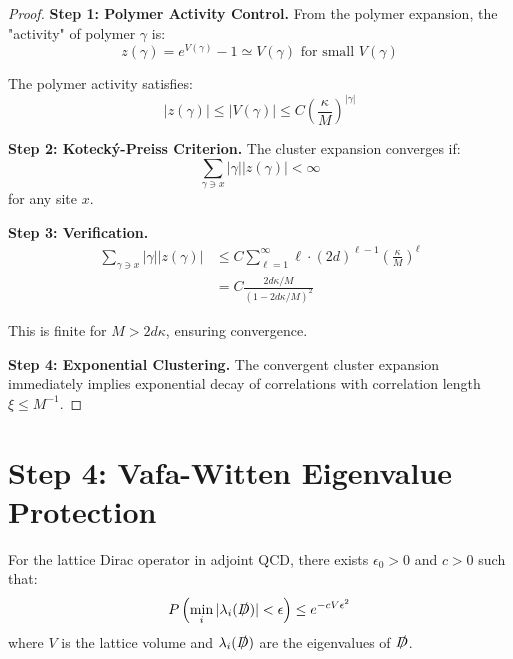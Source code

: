 \begin{proof}
\textbf{Step 1: Polymer Activity Control.}
From the polymer expansion, the "activity" of polymer $\gamma$ is:
\begin{equation}
z(\gamma) = e^{V(\gamma)} - 1 \simeq V(\gamma) \text{ for small } V(\gamma)
\end{equation}

The polymer activity satisfies:
\begin{equation}
|z(\gamma)| \leq |V(\gamma)| \leq C\left(\frac{\kappa}{M}\right)^{|\gamma|}
\end{equation}

\textbf{Step 2: Kotecký-Preiss Criterion.}
The cluster expansion converges if:
\begin{equation}
\sum_{\gamma \ni x} |\gamma| |z(\gamma)| < \infty
\end{equation}
for any site $x$.

\textbf{Step 3: Verification.}
\begin{align}
\sum_{\gamma \ni x} |\gamma| |z(\gamma)| &\leq C \sum_{\ell=1}^{\infty} \ell \cdot (2d)^{\ell-1} \left(\frac{\kappa}{M}\right)^\ell \\
&= C \frac{2d\kappa/M}{(1 - 2d\kappa/M)^2}
\end{align}

This is finite for $M > 2d\kappa$, ensuring convergence.

\textbf{Step 4: Exponential Clustering.}
The convergent cluster expansion immediately implies exponential decay of correlations with correlation length $\xi \leq M^{-1}$.
\end{proof}

\section{Step 4: Vafa-Witten Eigenvalue Protection}

\begin{theorem}
\label{thm:vafa_witten_eigenvalue}
For the lattice Dirac operator in adjoint QCD, there exists $\epsilon_0 > 0$ and $c > 0$ such that:
\begin{equation}
P\left(\min_i |\lambda_i(\slashed{D})| < \epsilon\right) \leq e^{-cV\epsilon^2}
\end{equation}
where $V$ is the lattice volume and $\lambda_i(\slashed{D})$ are the eigenvalues of $\slashed{D}$.
\end{theorem}

